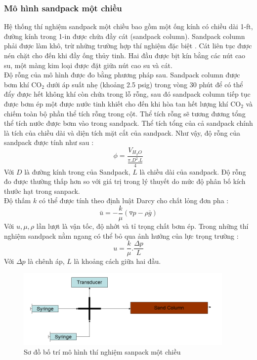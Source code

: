 \documentclass[12pt,a4paper]{article}
\begin{document}
	\subsubsection{Mô hình sandpack một chiều}
	Hệ thống thí nghiệm sandpack một chiều bao gồm một ống kính có chiều dài 1-ft, đường kính trong 1-in được chứa đầy cát (sandpack column). Sandpack column phải được làm khô, trừ những trường hợp thí nghiệm đặc biệt \cite{li2011study}. Cát liên tục được nén chặt cho đến khi đầy ống thủy tinh. Hai đầu được bịt kín bằng các nút cao su, một màng kim loại được đặt giữa nút cao su và cát.\\
	Độ rỗng của mô hình được đo bằng phương pháp sau. Sandpack column được bơm khí CO$_2$ dưới áp suất nhẹ (khoảng 2.5 psig) trong vòng 30 phút để có thể đẩy được hết không khí còn chứa trong lỗ rỗng, sau đó sandpack column tiếp tục được bơm ép một được nước tinh khiết cho đến khi hòa tan hết lượng khí CO$_2$ và chiếm toàn bộ phần thể tích rỗng trong cột. Thể tích rỗng sẽ tương đương tổng thể tích nước được bơm vào trong sandpack. Thể tích tổng của cả sandpack chính là tích của chiều dài và diện tích mặt cắt của sandpack. Như vậy, độ rỗng của sandpack được tính như sau \cite{li2011study}:
		\begin{equation}
			\phi=\frac{V_{H_2O}}{\frac{\pi.D
			^2.L}{4}}
		\end{equation}
	Với $D$ là đường kính trong của Sandpack, $L$ là chiều dài của sandpack. Độ rỗng đo được thường thấp hơn so với giá trị trong lý thuyết do mức độ phân bố kích thước hạt trong sanpack.\\Độ thấm $k$ có thể được tính theo định luật Darcy cho chất lỏng đơn pha \cite{li2011study}:
		\begin{equation}
			\bar u =-\frac{k}{\mu}(\triangledown p-\rho \bar g)
		\end{equation}
	Với $u, \mu, \rho$ lần lượt là vận tốc, độ nhớt và tỉ trọng chất bơm ép. Trong những thí nghiệm sandpack nằm ngang có thể bỏ qua ảnh hưởng của lực trọng trường \cite{li2011study}:
		\begin{equation}
			u=\frac{k}{\mu}.\frac{\Delta p}{L}
		\end{equation}
	Với $\Delta p$ là chênh áp, $L$ là khoảng cách giữa hai đầu.
		\begin{figure}[h]
			\centering
			\includegraphics[scale=1]{Fig/1d-sanpack.PNG}
			\caption{Sơ đồ bố trí mô hình thí nghiệm sanpack một chiều \cite{li2011study}}
		\end{figure}
	\newpage
\end{document}
